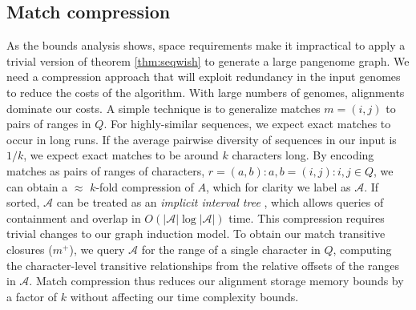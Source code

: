 \documentclass{bioinfo}
\theoremstyle{definition}
\begin{document}



\subsection{Match compression}
\label{sec:matchcompression}

As the bounds analysis shows, space requirements make it impractical to apply a trivial version of theorem \ref{thm:seqwish} to generate a large pangenome graph.
We need a compression approach that will exploit redundancy in the input genomes to reduce the costs of the algorithm.
With large numbers of genomes, alignments dominate our costs.
A simple technique is to generalize matches $m = (i, j)$ to pairs of ranges in $Q$.
For highly-similar sequences, we expect exact matches to occur in long runs.
If the average pairwise diversity of sequences in our input is $1/k$, we expect exact matches to be around $k$ characters long.
By encoding matches as pairs of ranges of characters, $r = (a, b) : a, b = (i, j) : i, j \in Q$, we can obtain a $\approx$ $k$-fold compression of $A$, which for clarity we label as $\mathcal{A}$.
If sorted, $\mathcal{A}$ can be treated as an \textit{implicit interval tree} \citep{Li_bedtk_2020}, which allows queries of containment and overlap in $O(|\mathcal{A}| \log |\mathcal{A}|)$ time.
This compression requires trivial changes to our graph induction model.
To obtain our match transitive closures ($m^+$), we query $\mathcal{A}$ for the range of a single character in $Q$, computing the character-level transitive relationships from the relative offsets of the ranges in $\mathcal{A}$.
Match compression thus reduces our alignment storage memory bounds by a factor of $k$ without affecting our time complexity bounds.
\end{document}
